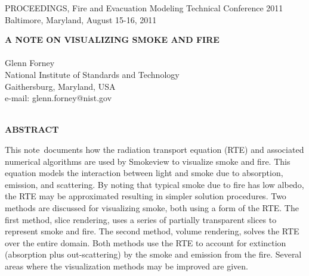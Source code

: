 \documentclass[10pt]{article}
\newcommand{\paper}{note}
\begin{document}



\pagestyle{plain}

%
%
\newcommand{\hhref}[1]{\href{#1}{{\tt #1}}}


\pagestyle{empty}
%
%

\newpage

PROCEEDINGS, Fire and Evacuation Modeling Technical Conference 2011 \\
Baltimore, Maryland, August 15-16, 2011

\begin{center}
{\bf A NOTE ON VISUALIZING SMOKE AND FIRE} \\
\hspace{1in} \\
Glenn Forney \\
National Institute of Standards and Technology \\
Gaithersburg, Maryland, USA \\
e-mail: glenn.forney@nist.gov \\
\hspace{1in} \\
\end{center}
\begin{center}
{\bf ABSTRACT}\\
\end{center}

This \paper\ documents how the radiation transport equation (RTE) and associated numerical algorithms are used by Smokeview to visualize smoke and fire.  This equation models the interaction between light and smoke due to absorption, emission, and scattering.  By noting that typical smoke due to fire has low albedo, the RTE may be approximated resulting in simpler solution procedures. Two methods are discussed for visualizing smoke, both using a form of the RTE.  The first method, slice rendering,  uses a series of partially transparent slices to represent smoke and fire. The second method, volume rendering, solves the RTE over the entire domain. Both methods use the RTE to account for extinction (absorption plus out-scattering) by the smoke and emission from the fire.  Several areas where the visualization methods may be improved are given.

%
%



%
%
\newpage


\end{document}
